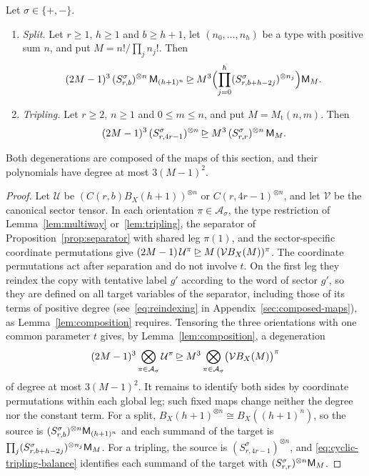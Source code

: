 \begin{corollary}\label{cor:oriented-relations}
Let \(\sigma\in\{+,-\}\).
\begin{enumerate}
\item[(a)] \emph{Split.} Let \(r\ge1\), \(h\ge1\) and \(b\ge h+1\), let
\((n_0,\ldots,n_h)\) be a type with positive sum \(n\), and put
\(M=n!/\prod_jn_j!\). Then
\begin{equation}\label{eq:split-relation}
 (2M-1)^3\,(S^\sigma_{r,b})^{\otimes n}\,\mathsf M_{(h+1)^n}
 \unrhd M^3\Bigl(\prod_{j=0}^h(S^\sigma_{r,b+h-2j})^{\otimes n_j}\Bigr)
 \mathsf M_M .
\end{equation}
\item[(b)] \emph{Tripling.} Let \(r\ge2\), \(n\ge1\) and \(0\le m\le n\),
and put \(M=M_{\mathrm t}(n,m)\). Then
\begin{equation}\label{eq:tripling-relation}
 (2M-1)^3\,(S^\sigma_{r,4r-1})^{\otimes n}
 \unrhd M^3\,(S^\sigma_{r,r})^{\otimes n}\,\mathsf M_M .
\end{equation}
\end{enumerate}
Both degenerations are composed of the maps of this section, and their
polynomials have degree at most \(3(M-1)^2\).
\end{corollary}

\begin{proof}
Let \(\mathcal U\) be \((C(r,b)B_X(h+1))^{\otimes n}\) or
\(C(r,4r-1)^{\otimes n}\), and let \(\mathcal V\) be the canonical sector
tensor. In each orientation \(\pi\in\mathcal A_\sigma\), the type
restriction of Lemma~\ref{lem:multiway} or~\ref{lem:tripling}, the
separator of Proposition~\ref{prop:separator} with shared leg \(\pi(1)\),
and the sector-specific coordinate permutations give
\((2M-1)\,\mathcal U^\pi\unrhd M\,(\mathcal V B_X(M))^\pi\). The coordinate
permutations act after separation and do not involve \(t\). On the first
leg they reindex the copy with tentative label \(g'\) according to the
word of sector \(g'\), so they are defined on all target variables of the
separator, including those of its terms of positive degree
(see~\eqref{eq:reindexing} in Appendix~\ref{sec:composed-maps}), as
Lemma~\ref{lem:composition} requires. Tensoring the three orientations
with one common parameter \(t\) gives, by Lemma~\ref{lem:composition}, a
degeneration
\[
 (2M-1)^3\bigotimes_{\pi\in\mathcal A_\sigma}\mathcal U^\pi
 \unrhd M^3\bigotimes_{\pi\in\mathcal A_\sigma}
 \bigl(\mathcal V B_X(M)\bigr)^\pi
\]
of degree at most \(3(M-1)^2\). It remains to identify both sides by
coordinate permutations within each global leg; such fixed maps change
neither the degree nor the constant term. For a split,
\(B_X(h+1)^{\otimes n}\cong B_X((h+1)^n)\), so the source is
\((S^\sigma_{r,b})^{\otimes n}\mathsf M_{(h+1)^n}\) and each summand of the
target is \(\prod_j(S^\sigma_{r,b+h-2j})^{\otimes n_j}\mathsf M_M\). For a
tripling, the source is \((S^\sigma_{r,4r-1})^{\otimes n}\), and
\eqref{eq:cyclic-tripling-balance} identifies each summand of the target
with \((S^\sigma_{r,r})^{\otimes n}\mathsf M_M\).
\end{proof}

